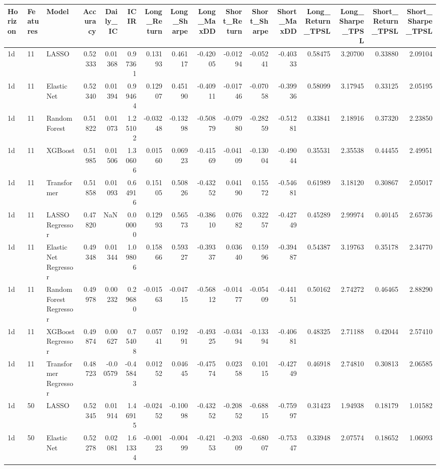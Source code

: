 \begin{tabular}{lllrrrrrrrrrrrrr}
\toprule
Horizon & Features & Model & Accuracy & Daily_IC & ICIR & Long_Return & Long_Sharpe & Long_MaxDD & Short_Return & Short_Sharpe & Short_MaxDD & Long_Return_TPSL & Long_Sharpe_TPSL & Short_Return_TPSL & Short_Sharpe_TPSL \\
\midrule
1d & 11 & LASSO & 0.52333 & 0.01368 & 0.97361 & 0.13193 & 0.46117 & -0.42005 & -0.01294 & -0.05241 & -0.40333 & 0.58475 & 3.20700 & 0.33880 & 2.09104 \\
1d & 11 & Elastic Net & 0.52340 & 0.01394 & 0.99464 & 0.12907 & 0.45190 & -0.40911 & -0.01746 & -0.07058 & -0.39936 & 0.58099 & 3.17945 & 0.33125 & 2.05195 \\
1d & 11 & Random Forest & 0.51822 & 0.01073 & 1.25102 & -0.03248 & -0.13298 & -0.50879 & -0.07980 & -0.28259 & -0.51281 & 0.33841 & 2.18916 & 0.37320 & 2.23850 \\
1d & 11 & XGBoost & 0.51985 & 0.01506 & 1.30606 & 0.01560 & 0.06923 & -0.41569 & -0.04109 & -0.13004 & -0.49044 & 0.35531 & 2.35538 & 0.44455 & 2.49951 \\
1d & 11 & Transformer & 0.51858 & 0.01093 & 0.64916 & 0.15105 & 0.50826 & -0.43252 & 0.04190 & 0.15572 & -0.54681 & 0.61989 & 3.18120 & 0.30867 & 2.05017 \\
1d & 11 & LASSO Regressor & 0.47820 & NaN & 0.00000 & 0.12993 & 0.56573 & -0.38610 & 0.07682 & 0.32257 & -0.42749 & 0.45289 & 2.99974 & 0.40145 & 2.65736 \\
1d & 11 & Elastic Net Regressor & 0.49348 & 0.01344 & 1.09806 & 0.15866 & 0.59327 & -0.39337 & 0.03640 & 0.15996 & -0.39487 & 0.54387 & 3.19763 & 0.35178 & 2.34770 \\
1d & 11 & Random Forest Regressor & 0.49978 & 0.00232 & 0.29680 & -0.01563 & -0.04715 & -0.56812 & -0.01477 & -0.05409 & -0.44151 & 0.50162 & 2.74272 & 0.46465 & 2.88290 \\
1d & 11 & XGBoost Regressor & 0.49874 & 0.00627 & 0.75408 & 0.05741 & 0.19291 & -0.49325 & -0.03494 & -0.13394 & -0.40681 & 0.48325 & 2.71188 & 0.42044 & 2.57410 \\
1d & 11 & Transformer Regressor & 0.48723 & -0.00579 & -0.45843 & 0.01252 & 0.04645 & -0.47574 & 0.02358 & 0.10115 & -0.42749 & 0.46918 & 2.74810 & 0.30813 & 2.06585 \\
1d & 50 & LASSO & 0.52345 & 0.01914 & 1.46915 & -0.02452 & -0.10098 & -0.43252 & -0.20852 & -0.68815 & -0.75997 & 0.31423 & 1.94938 & 0.18179 & 1.01582 \\
1d & 50 & Elastic Net & 0.52278 & 0.02081 & 1.61334 & -0.00123 & -0.00499 & -0.42153 & -0.20309 & -0.68007 & -0.75347 & 0.33948 & 2.07574 & 0.18652 & 1.06093 \\

\end{tabular}
